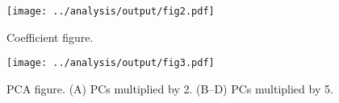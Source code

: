 \documentclass[12pt]{article}
\begin{document}
\clearpage

\begin{figure}
\centering
\texttt{[image: ../analysis/output/fig2.pdf]}
\caption{\label{fig:coefs}
Coefficient figure.
}
\end{figure}



\clearpage

\begin{figure}
\centering
\texttt{[image: ../analysis/output/fig3.pdf]}
\caption{\label{fig:pca}
PCA figure.
(A) PCs multiplied by 2.
(B--D) PCs multiplied by 5.
}
\end{figure}
\end{document}
